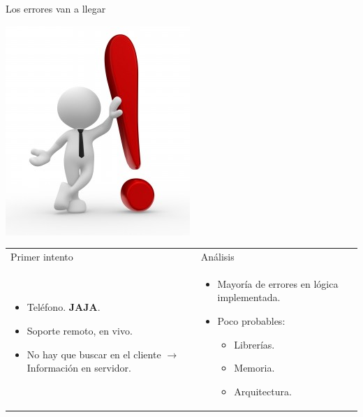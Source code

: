 \begin{frame}{Los errores van a llegar}
  \begin{center}
    \includegraphics[scale=0.3]{img/ed_presenting}
  \end{center}

  \begin{tabular}{l l}
    Primer intento & Análisis \\ \pause
    \parbox{0.5\textwidth}{
      \begin{itemize}
        \item Teléfono. \pause \textbf{JAJA}. \pause
        \item Soporte remoto, en vivo.
        \item No hay que buscar en el cliente $\rightarrow$ Información en
        servidor.
      \end{itemize}
    } \pause &
    \parbox{0.5\textwidth}{
      \begin{itemize}
        \item Mayoría de errores en lógica implementada. \pause
        \item Poco probables:
        \begin{itemize}
          \item Librerías.
          \item Memoria.
          \item Arquitectura.
        \end{itemize}
      \end{itemize}
    }
  \end{tabular}
\end{frame}

